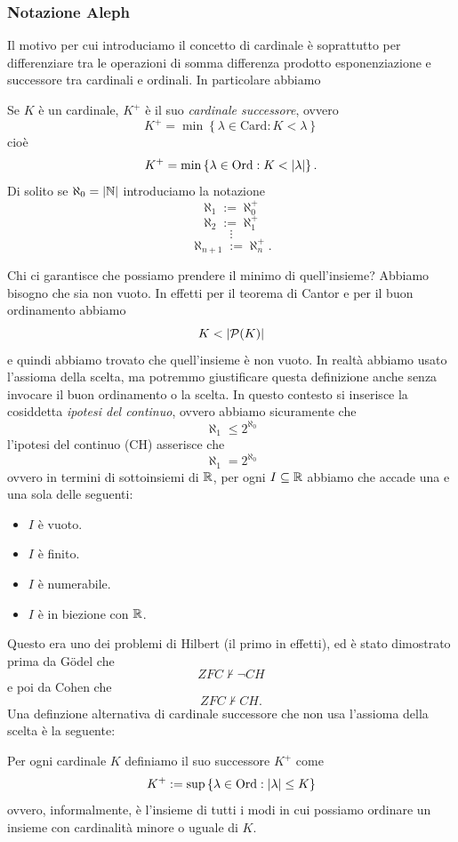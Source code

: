 \documentclass[11pt]{scrartcl}
\newcommand{\parti}[1]{\mathcal{P}\!\left(#1\right)}
\begin{document}
 	\subsubsection{Notazione Aleph}
 	Il motivo per cui introduciamo il concetto di cardinale è soprattutto per differenziare tra le operazioni di somma differenza prodotto esponenziazione e successore tra cardinali e ordinali. In particolare abbiamo
 	\begin{definition}
 		Se $K$ è un cardinale, $K^+$ è il suo \textit{cardinale successore}, ovvero
 		$$K^+=\min\left\{\lambda\in \text{Card}:K<\lambda\right\}$$
 		cioè
 		$$K^+=\min\left\{\lambda\in \text{Ord}:K<\left\lvert \lambda \right\rvert\right\}.$$
 		Di solito se $\aleph_0=\left\lvert \mathbb N \right\rvert$ introduciamo la notazione
 		$$\aleph_1:=\aleph_0^+$$
 		$$\aleph_2:=\aleph_1^+$$
 		$$\vdots$$
 		$$\aleph_{n+1}:=\aleph_n^+.$$
 	\end{definition}
 	Chi ci garantisce che possiamo prendere il minimo di quell'insieme? Abbiamo bisogno che sia non vuoto. In effetti per il teorema di Cantor e per il buon ordinamento abbiamo
 	$$K<\abs{\parti{K}}$$
 	e quindi abbiamo trovato che quell'insieme è non vuoto. In realtà abbiamo usato l'assioma della scelta, ma potremmo giustificare questa definizione anche senza invocare il buon ordinamento o la scelta. In questo contesto si inserisce la cosiddetta \textit{ipotesi del continuo}, ovvero abbiamo sicuramente che 
 	$$\aleph_1\le 2^{\aleph_0}$$
 	l'ipotesi del continuo (CH) asserisce che
 	$$\aleph_1=2^{\aleph_0}$$
 	ovvero in termini di sottoinsiemi di $\mathbb R$, per ogni $I\subseteq\mathbb R$ abbiamo che accade una e una sola delle seguenti:
 	\begin{itemize}
 		\item $I$ è vuoto.
 		\item $I$ è finito.
 		\item $I$ è numerabile.
 		\item $I$ è in biezione con $\mathbb R$.
 	\end{itemize}
 	Questo era uno dei problemi di Hilbert (il primo in effetti), ed è stato dimostrato prima da G\"odel che
 	$$ZFC\not\vdash \lnot CH$$
 	e poi da Cohen che
 	$$ZFC\not\vdash CH.$$
 	Una definzione alternativa di cardinale successore che non usa l'assioma della scelta è la seguente:
 	\begin{definition}
 		Per ogni cardinale $K$ definiamo il suo successore $K^+$ come
 		$$K^+:=\sup\left\{\lambda\in\text{Ord}:\left\lvert \lambda \right\rvert\le K\right\}$$
 		ovvero, informalmente, è l'insieme di tutti i modi in cui possiamo ordinare un insieme con cardinalità minore o uguale di $K$.
 	\end{definition}
\end{document}

